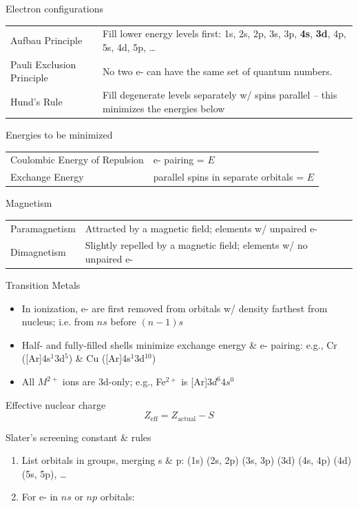 \documentclass[10pt,landscape]{article}
\newcommand{\extraline}{\vspace{1em}}
\newcommand{\tableindent}{\hspace{1.5em}}
\begin{document}
\begin{multicols}{3}
Electron configurations

\begin{tabular}{@{\tableindent}p{2.5cm}p{4.5cm}@{}}
Aufbau Principle & Fill lower energy levels first: 1s, 2s, 2p, 3s, 3p, \textbf{4s}, \textbf{3d}, 4p, 5s, 4d, 5p, \ldots\\
Pauli Exclusion Principle & No two e- can have the same set of quantum numbers. \\
Hund's Rule & Fill degenerate levels separately w/ spins parallel -- this minimizes the energies below \\
\end{tabular}
\extraline

Energies to be minimized

\begin{tabular}{@{\tableindent}p{25mm}p{47mm}@{}}
	Coulombic Energy of Repulsion & \textdownarrow{} e- pairing = \textdownarrow{} $E$ \\
	Exchange Energy & \textuparrow{} parallel spins in separate orbitals = \textdownarrow{} $E$
\end{tabular}


Magnetism

\begin{tabular}{@{\tableindent}lp{5cm}@{}}
Paramagnetism & Attracted by a magnetic field; elements w/ unpaired e- \\
Dimagnetism & Slightly repelled by a magnetic field; elements w/ no unpaired e-
\end{tabular}

Transition Metals
\begin{itemize}
\item In ionization, e- are first removed from orbitals w/ density farthest from nucleus; i.e. from $ns$ before $(n-1)s$
\item Half- and fully-filled shells minimize exchange energy \& e- pairing: e.g., Cr ([Ar]4s$^1$3d$^{5}$) \& Cu  ([Ar]4s$^1$3d$^{10}$) 
\item All $M^{2+}$ ions are 3d-only; e.g.,  Fe$^{2+}$ is [Ar]$3d^{6}4s^0$
\end{itemize}  


Effective nuclear charge
\[ Z_\text{eff} = Z_\text{actual} - S \]

Slater's screening constant \& rules
\begin{enumerate}
\item List orbitals in groups, merging s \& p: (1s) (2s, 2p) (3s, 3p) (3d) (4s, 4p) (4d) (5s, 5p), \ldots 
\item For e- in $ns$ or $np$ orbitals:


\end{enumerate}
\end{multicols}
\end{document}
